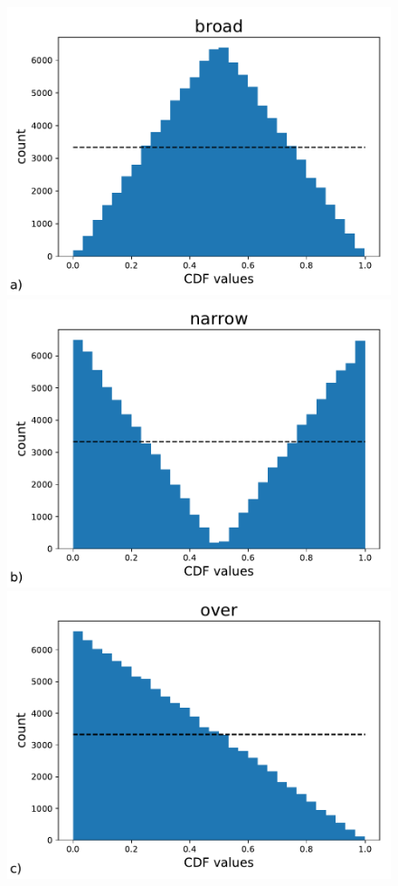 \documentclass[BCOR=1mm, DIV=calc,10pt,
twoside=true,
twocolumn,
headings=normal]{scrartcl}
\begin{document}
\begin{figure}
\begin{center}
\includegraphics[scale=0.25]{figs/cdf_truth_broad}
\includegraphics[scale=0.25]{figs/cdf_truth_narrow}
\includegraphics[scale=0.25]{figs/cdf_truth_over}

\end{center}
\end{figure}
\end{document}
